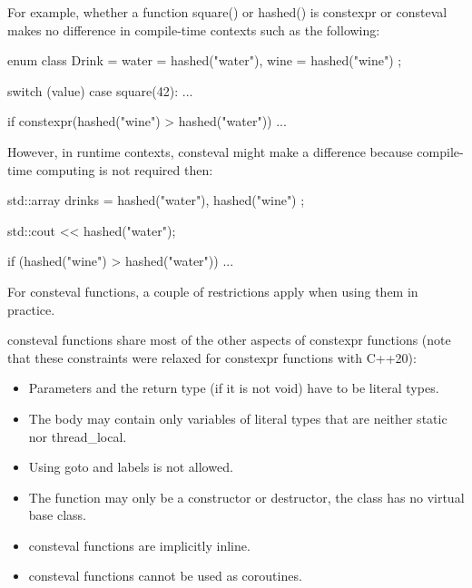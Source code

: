For example, whether a function square() or hashed() is constexpr or consteval makes no difference in compile-time contexts such as the following:

\begin{cpp}
enum class Drink = { water = hashed("water"), wine = hashed("wine") };

switch (value) {
	case square(42):
	...
}

if constexpr(hashed("wine") > hashed("water")) {
	...
}
\end{cpp}

However, in runtime contexts, consteval might make a difference because compile-time computing is not required then:

\begin{cpp}
std::array drinks = { hashed("water"), hashed("wine") };

std::cout << hashed("water");

if (hashed("wine") > hashed("water")) {
	...
}
\end{cpp}


For consteval functions, a couple of restrictions apply when using them in practice.


consteval functions share most of the other aspects of constexpr functions (note that these constraints were relaxed for constexpr functions with C++20):

\begin{itemize}
\item 
Parameters and the return type (if it is not void) have to be literal types.

\item 
The body may contain only variables of literal types that are neither static nor thread\_local.

\item 
Using goto and labels is not allowed.

\item 
The function may only be a constructor or destructor, the class has no virtual base class.

\item 
consteval functions are implicitly inline.

\item 
consteval functions cannot be used as coroutines.
\end{itemize}


